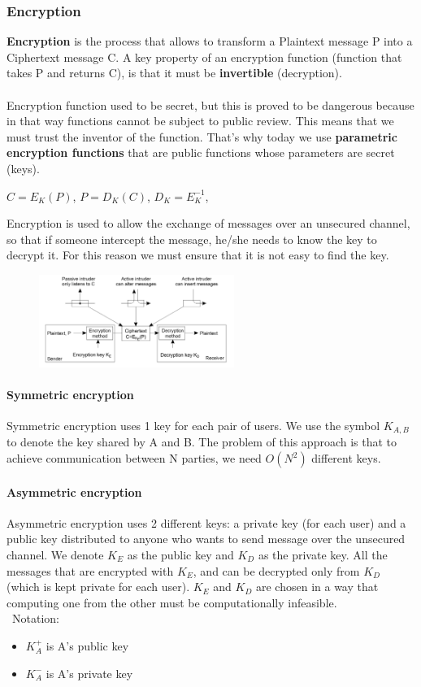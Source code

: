 \documentclass[10pt,a4paper]{article}
\begin{document}
\subsubsection{Encryption}
\textbf{Encryption} is the process that allows to transform a Plaintext message P into a Ciphertext message C. A key property of an encryption function (function that takes P and returns C), is that it must be \textbf{invertible} (decryption). \\ \\
Encryption function used to be secret, but this is proved to be dangerous because in that way functions cannot be subject to public review. This means that we must trust the inventor of the function. That's why today we use \textbf{parametric encryption functions} that are public functions whose parameters are secret (keys).
\begin{description}
	\item $C=E_K(P)$, $P=D_K(C)$, $D_K=E_K^{-1}$, 
\end{description}
Encryption is used to allow the exchange of messages over an unsecured channel, so that if someone intercept the message, he/she needs to know the key to decrypt it. For this reason we must ensure that it is not easy to find the key.
\begin{figure}[h!]\hfill \includegraphics[width=180pt]{images/encryption.png}\hspace*{\fill}
  \label{fig:encryption}
\end{figure}
\paragraph{Symmetric encryption}
Symmetric encryption uses 1 key for each pair of users. We use the symbol $K_{A,B}$ to denote the key shared by A and B. The problem of this approach is that to achieve communication between N parties, we need $O(N^2)$ different keys.
\paragraph{Asymmetric encryption}
Asymmetric encryption uses 2 different keys: a private key (for each user) and a public key distributed to anyone who wants to send message over the unsecured channel. We denote $K_E$ as the public key and $K_D$ as the private key. All the messages that are encrypted with $K_E$, and can be decrypted only from $K_D$ (which is kept private for each user). $K_E$ and $K_D$ are chosen in a way that computing one from the other must be computationally infeasible. \\\
Notation:
\begin{itemize}
	\item $K_A^+$ is A's public key
	\item $K_A^-$ is A's private key
\end{itemize}
\end{document}
